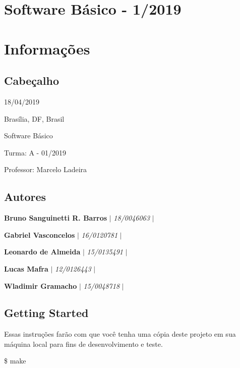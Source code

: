 

\section*{Software Básico -\/ 1/2019}

\section*{Informações}

\subsection*{Cabeçalho}


\begin{DoxyItemize}
\item 18/04/2019
\item Brasília, DF, Brasil
\item Software Básico
\item Turma\+: A -\/ 01/2019
\item Professor\+: Marcelo Ladeira
\end{DoxyItemize}

\subsection*{Autores}


\begin{DoxyItemize}
\item {\bfseries{Bruno Sanguinetti R. Barros}} $\vert$ {\itshape 18/0046063} $\vert$
\item {\bfseries{Gabriel Vasconcelos}} $\vert$ {\itshape 16/0120781} $\vert$
\item {\bfseries{Leonardo de Almeida}} $\vert$ {\itshape 15/0135491} $\vert$
\item {\bfseries{Lucas Mafra}} $\vert$ {\itshape 12/0126443} $\vert$
\item {\bfseries{Wladimir Gramacho}} $\vert$ {\itshape 15/0048718} $\vert$
\end{DoxyItemize}

\subsection*{Getting Started}

Essas instruções farão com que você tenha uma cópia deste projeto em sua máquina local para fins de desenvolvimento e teste.


\begin{DoxyCode}{0}
\DoxyCodeLine{}
\end{DoxyCode}
 \$ make 
\begin{DoxyCode}{0}
\end{DoxyCode}


